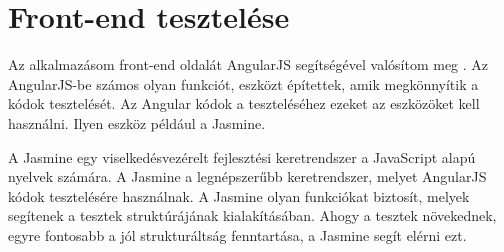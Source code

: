 \section{Front-end tesztelése}

Az alkalmazásom front-end oldalát AngularJS segítségével valósítom meg \cite{angular_test}. Az AngularJS-be számos olyan funkciót, eszközt építettek, amik megkönnyítik a kódok tesztelését. Az Angular kódok a teszteléséhez ezeket az eszközöket kell használni. Ilyen eszköz például a Jasmine.

A Jasmine egy viselkedésvezérelt fejlesztési keretrendszer a JavaScript alapú nyelvek számára. A Jasmine a legnépszerűbb keretrendszer, melyet AngularJS kódok tesztelésére használnak. A Jasmine olyan funkciókat biztosít, melyek segítenek a tesztek struktúrájának kialakításában. Ahogy a tesztek növekednek, egyre fontosabb a jól strukturáltság fenntartása, a Jasmine segít elérni ezt.
